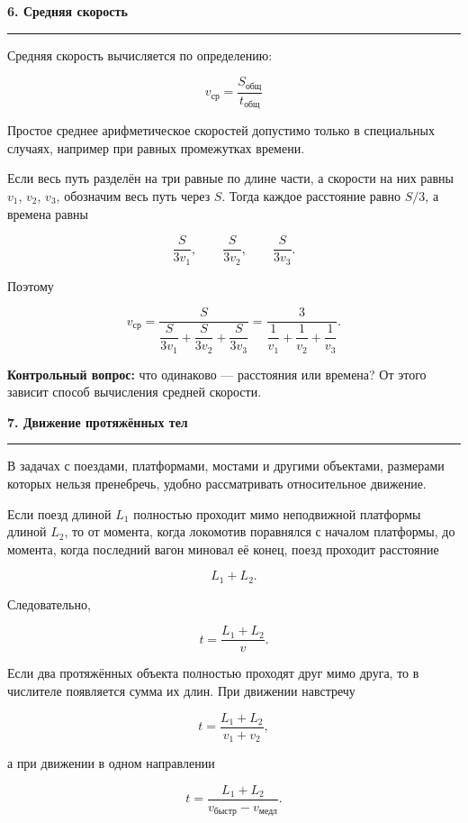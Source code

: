\documentclass[a4paper,12pt]{article}
\newcommand{\sect}[1]{%
    \vspace{0.35em}%
    {\Large\bfseries\color{darkaccent}#1}\par
    \vspace{0.22em}%
    \color{linegray}\hrule
    \color{textgray}%
    \vspace{0.55em}%
}
\newcommand{\important}[1]{\textbf{\color{darkaccent}#1}}
\begin{document}

\sect{6. Средняя скорость}

Средняя скорость вычисляется по определению:

\[
\boxed{
 v_{\text{ср}}=
 \frac{S_{\text{общ}}}{t_{\text{общ}}}
}
\]

Простое среднее арифметическое скоростей допустимо только в специальных случаях,
например при равных промежутках времени.

Если весь путь разделён на три равные по длине части,
а скорости на них равны $v_1$, $v_2$, $v_3$,
обозначим весь путь через $S$.
Тогда каждое расстояние равно $S/3$, а времена равны

\[
\frac{S}{3v_1},
\qquad
\frac{S}{3v_2},
\qquad
\frac{S}{3v_3}.
\]

Поэтому

\[
v_{\text{ср}}
=
\frac{S}{
\dfrac{S}{3v_1}
+
\dfrac{S}{3v_2}
+
\dfrac{S}{3v_3}}
=
\frac{3}{
\dfrac{1}{v_1}
+
\dfrac{1}{v_2}
+
\dfrac{1}{v_3}}.
\]

\important{Контрольный вопрос:}
что одинаково --- расстояния или времена?
От этого зависит способ вычисления средней скорости.


\sect{7. Движение протяжённых тел}

В задачах с поездами, платформами, мостами и другими объектами,
размерами которых нельзя пренебречь, удобно рассматривать относительное движение.

Если поезд длиной $L_1$ полностью проходит мимо неподвижной платформы длиной $L_2$,
то от момента, когда локомотив поравнялся с началом платформы,
до момента, когда последний вагон миновал её конец,
поезд проходит расстояние

\[
L_1+L_2.
\]

Следовательно,

\[
t=\frac{L_1+L_2}{v}.
\]

Если два протяжённых объекта полностью проходят друг мимо друга,
то в числителе появляется сумма их длин.
При движении навстречу

\[
t=\frac{L_1+L_2}{v_1+v_2},
\]

а при движении в одном направлении

\[
t=\frac{L_1+L_2}{v_{\text{быстр}}-v_{\text{медл}}}.
\]
\end{document}
